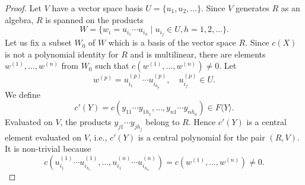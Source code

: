 \documentclass[10pt,a4paper]{amsart}
\begin{document}
\begin{proof}
Let $V$ have a vector space basis $U=\{u_1,u_2,\ldots\}$. Since $V$ generates $R$ as an algebra,
$R$ is spanned on the products
\[
W=\{w_i=u_{i_1}\cdots u_{i_h}\mid u_{i_j}\in U,h=1,2,\ldots\}.
\]
Let us fix a subset $W_0$ of $W$ which is a basis of the vector space $R$.
Since $c(X)$ is not a polynomial identity for $R$ and is multilinear, there are elements $w^{(1)},\ldots,w^{(n)}$ from $W_0$ such that
$c(w^{(1)},\ldots,w^{(n)})\not=0$. Let
\[
w^{(p)}=u_{i_1}^{(p)}\cdots u_{i_{h_p}}^{(p)},\quad u_{i_j}^{(p)}\in U.
\]
We define
\[
c'(Y)=c(y_{11}\cdots y_{1h_1},\ldots,y_{n1}\cdots y_{nh_n})\in F\langle Y\rangle.
\]
Evaluated on $V$, the products $y_{j1}\cdots y_{jh_j}$ belong to $R$. Hence $c'(Y)$ is a central element evaluated on $V$, i.e., $c'(Y)$
is a central polynomial for the pair $(R,V)$. It is non-trivial because
\[
c(u_{i_1}^{(1)}\cdots u_{i_{h_1}}^{(1)},\ldots,u_{i_1}^{(n)}\cdots u_{i_{h_n}}^{(n)})=c(w^{(1)},\ldots,w^{(n)})\not=0.
\]
\end{proof}
\end{document}
